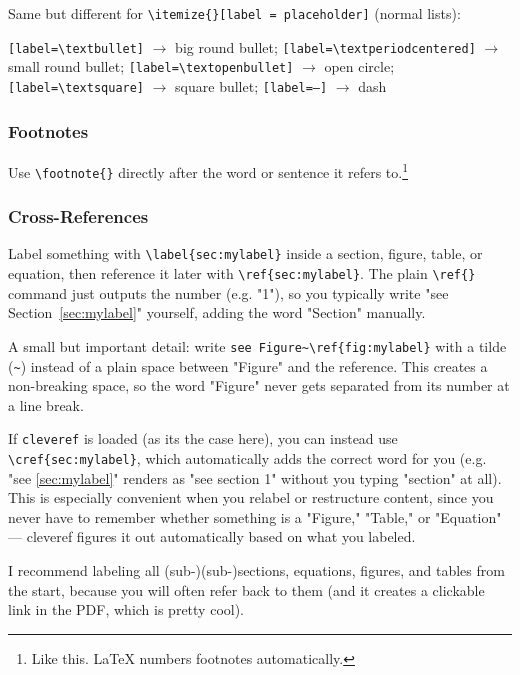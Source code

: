 Same but different for \texttt{\textbackslash itemize\{\}[label = placeholder]} (normal lists): 

\texttt{[label=\textbackslash textbullet]} \(\rightarrow\) big round bullet; 
\texttt{[label=\textbackslash textperiodcentered]} \(\rightarrow\) small round bullet; 
\texttt{[label=\textbackslash textopenbullet]} \(\rightarrow\) open circle; 
\texttt{[label=\textbackslash textsquare]} \(\rightarrow\) square bullet; 
\texttt{[label=--]} \(\rightarrow\) dash


\subsubsection*{Footnotes}
Use \verb|\footnote{}| directly after the word or sentence it refers to.\footnote{Like this. LaTeX numbers footnotes automatically.}

\subsubsection*{Cross-References}
\label{sec:mylabel}

Label something with \verb|\label{sec:mylabel}| inside a section, figure, table, or equation, then reference it later with \verb|\ref{sec:mylabel}|. The plain \verb|\ref{}| command just outputs the number (e.g. "1"), so you typically write "see Section~\ref{sec:mylabel}" yourself, adding the word "Section" manually.

A small but important detail: write \verb|see Figure~\ref{fig:mylabel}| with a tilde (\texttt{\textasciitilde}) instead of a plain space between "Figure" and the reference. This creates a non-breaking space, so the word "Figure" never gets separated from its number at a line break.

If \texttt{cleveref} is loaded (as its the case here), you can instead use \verb|\cref{sec:mylabel}|, which automatically adds the correct word for you (e.g. "see \cref{sec:mylabel}" renders as "see section 1" without you typing "section" at all). This is especially convenient when you relabel or restructure content, since you never have to remember whether something is a "Figure," "Table," or "Equation" --- cleveref figures it out automatically based on what you labeled.

I recommend labeling all (sub-)(sub-)sections, equations, figures, and tables from the start, because you will often refer back to them (and it creates a clickable link in the PDF, which is pretty cool).

